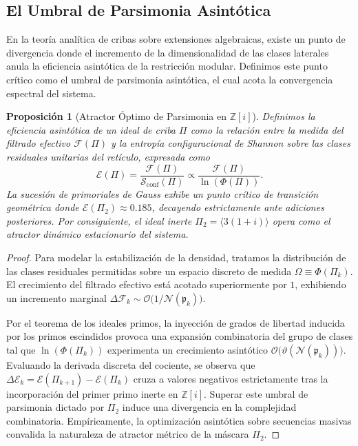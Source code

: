 \documentclass{article}
\numberwithin{equation}{section}
\theoremstyle{plain}
\newtheorem{proposicion}[teorema]{Proposición}
\theoremstyle{definition}
\begin{document}
\subsection{El Umbral de Parsimonia Asintótica}

En la teoría analítica de cribas sobre extensiones algebraicas, existe un punto de divergencia donde el incremento de la dimensionalidad de las clases laterales anula la eficiencia asintótica de la restricción modular. Definimos este punto crítico como el umbral de parsimonia asintótica, el cual acota la convergencia espectral del sistema.

\begin{proposicion}[Atractor Óptimo de Parsimonia en \texorpdfstring{$\mathbb{Z}[i]$}{Z[i]}]
\label{prop:atractor_gauss}
Definimos la eficiencia asintótica de un ideal de criba $\Pi$ como la relación entre la medida del filtrado efectivo $\mathcal{F}(\Pi)$ y la entropía configuracional de Shannon sobre las clases residuales unitarias del retículo, expresada como
\begin{equation}
    \mathcal{E}(\Pi) = \frac{\mathcal{F}(\Pi)}{\mathcal{S}_{\mathrm{conf}}(\Pi)} \propto \frac{\mathcal{F}(\Pi)}{\ln(\Phi(\Pi))}.
\end{equation}
La sucesión de primoriales de Gauss exhibe un punto crítico de transición geométrica donde $\mathcal{E}(\Pi_2) \approx 0.185$, decayendo estrictamente ante adiciones posteriores. Por consiguiente, el ideal inerte $\Pi_2 = \langle 3(1+i) \rangle$ opera como el atractor dinámico estacionario del sistema.
\end{proposicion}

\begin{proof}
Para modelar la estabilización de la densidad, tratamos la distribución de las clases residuales permitidas sobre un espacio discreto de medida $\Omega \equiv \Phi(\Pi_k)$. El crecimiento del filtrado efectivo está acotado superiormente por $1$, exhibiendo un incremento marginal $\Delta\mathcal{F}_k \sim \mathcal{O}\big(1/\mathcal{N}(\mathfrak{p}_k)\big)$.

Por el teorema de los ideales primos, la inyección de grados de libertad inducida por los primos escindidos provoca una expansión combinatoria del grupo de clases tal que $\ln(\Phi(\Pi_k))$ experimenta un crecimiento asintótico $\mathcal{O}\big(\vartheta(\mathcal{N}(\mathfrak{p}_k))\big)$. Evaluando la derivada discreta del cociente, se observa que $\Delta\mathcal{E}_k = \mathcal{E}(\Pi_{k+1}) - \mathcal{E}(\Pi_k)$ cruza a valores negativos estrictamente tras la incorporación del primer primo inerte en $\mathbb{Z}[i]$. Superar este umbral de parsimonia dictado por $\Pi_2$ induce una divergencia en la complejidad combinatoria. Empíricamente, la optimización asintótica sobre secuencias masivas convalida la naturaleza de atractor métrico de la máscara $\Pi_2$.
\end{proof}
\end{document}
